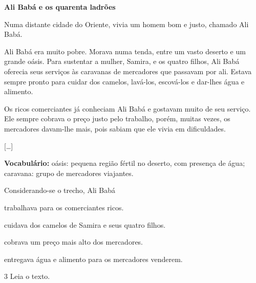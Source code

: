 \begin{myquote}
\textbf{Ali Babá e os quarenta ladrões}

Numa distante cidade do Oriente, vivia um homem bom e justo, chamado Ali
Babá.

Ali Babá era muito pobre. Morava numa tenda, entre um vasto deserto e um
grande oásis. Para sustentar a mulher, Samira, e os quatro filhos, Ali
Babá oferecia seus serviços às caravanas de mercadores que passavam por
ali. Estava sempre pronto para cuidar dos camelos, lavá-los, escová-los
e dar-lhes água e alimento.

Os ricos comerciantes já conheciam Ali Babá e gostavam muito de seu
serviço. Ele sempre cobrava o preço justo pelo trabalho, porém, muitas
vezes, os mercadores davam-lhe mais, pois sabiam que ele vivia em
dificuldades.

{[}\ldots{}{]}



\textbf{Vocabulário:} oásis: pequena região fértil no deserto, com presença de água; 
caravana: grupo de mercadores viajantes.
\end{myquote}

Considerando-se o trecho, Ali Babá

\begin{escolha}
\item trabalhava para os comerciantes ricos.

\item cuidava dos camelos de Samira e seus quatro filhos.

\item cobrava um preço mais alto dos mercadores.

\item entregava água e alimento para os mercadores venderem.
\end{escolha}



\num{3} Leia o texto.

